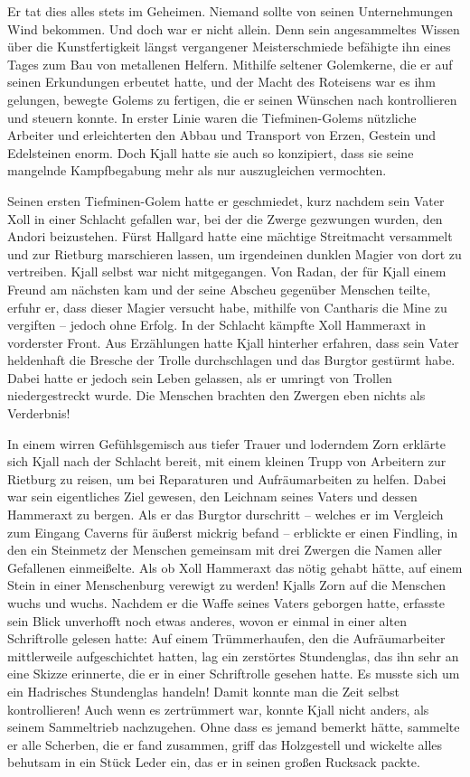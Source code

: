 \documentclass[10pt, a4paper, oneside]{book}
\begin{document}
\begin{multicols}{2}
Er tat dies alles stets im Geheimen. Niemand sollte von seinen Unternehmungen Wind bekommen. Und doch war er nicht allein. Denn sein angesammeltes Wissen über die Kunstfertigkeit längst vergangener Meisterschmiede befähigte ihn eines Tages zum Bau von metallenen Helfern. Mithilfe seltener Golemkerne, die er auf seinen Erkundungen erbeutet hatte, und der Macht des Roteisens war es ihm gelungen, bewegte Golems zu fertigen, die er seinen Wünschen nach kontrollieren und steuern konnte. In erster Linie waren die Tiefminen-Golems nützliche Arbeiter und erleichterten den Abbau und Transport von Erzen, Gestein und Edelsteinen enorm. Doch Kjall hatte sie auch so konzipiert, dass sie seine mangelnde Kampfbegabung mehr als nur auszugleichen vermochten.\bigskip

Seinen ersten Tiefminen-Golem hatte er geschmiedet, kurz nachdem sein Vater Xoll in einer Schlacht gefallen war, bei der die Zwerge gezwungen wurden, den Andori beizustehen. Fürst Hallgard hatte eine mächtige Streitmacht versammelt und zur Rietburg marschieren lassen, um irgendeinen dunklen Magier von dort zu vertreiben. Kjall selbst war nicht mitgegangen. Von Radan, der für Kjall einem Freund am nächsten kam und der seine Abscheu gegenüber Menschen teilte, erfuhr er, dass dieser Magier versucht habe, mithilfe von Cantharis die Mine zu vergiften – jedoch ohne Erfolg. In der Schlacht kämpfte Xoll Hammeraxt in vorderster Front. Aus Erzählungen hatte Kjall hinterher erfahren, dass sein Vater heldenhaft die Bresche der Trolle durchschlagen und das Burgtor gestürmt habe. Dabei hatte er jedoch sein Leben gelassen, als er umringt von Trollen niedergestreckt wurde. Die Menschen brachten den Zwergen eben nichts als Verderbnis!\bigskip

In einem wirren Gefühlsgemisch aus tiefer Trauer und loderndem Zorn erklärte sich Kjall nach der Schlacht bereit, mit einem kleinen Trupp von Arbeitern zur Rietburg zu reisen, um bei Reparaturen und Aufräumarbeiten zu helfen. Dabei war sein eigentliches Ziel gewesen, den Leichnam seines Vaters und dessen Hammeraxt zu bergen. Als er das Burgtor durschritt – welches er im Vergleich zum Eingang Caverns für äußerst mickrig befand – erblickte er einen Findling, in den ein Steinmetz der Menschen gemeinsam mit drei Zwergen die Namen aller Gefallenen einmeißelte. Als ob Xoll Hammeraxt das nötig gehabt hätte, auf einem Stein in einer Menschenburg verewigt zu werden! Kjalls Zorn auf die Menschen wuchs und wuchs. Nachdem er die Waffe seines Vaters geborgen hatte, erfasste sein Blick unverhofft noch etwas anderes, wovon er einmal in einer alten Schriftrolle gelesen hatte: Auf einem Trümmerhaufen, den die Aufräumarbeiter mittlerweile aufgeschichtet hatten, lag ein zerstörtes Stundenglas, das ihn sehr an eine Skizze erinnerte, die er in einer Schriftrolle gesehen hatte. Es musste sich um ein Hadrisches Stundenglas handeln! Damit konnte man die Zeit selbst kontrollieren! Auch wenn es zertrümmert war, konnte Kjall nicht anders, als seinem Sammeltrieb nachzugehen. Ohne dass es jemand bemerkt hätte, sammelte er alle Scherben, die er fand zusammen, griff das Holzgestell und wickelte alles behutsam in ein Stück Leder ein, das er in seinen großen Rucksack packte.\bigskip


\end{multicols}
\end{document}
